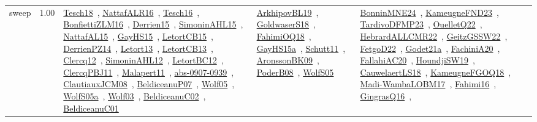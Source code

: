 {\begin{longtable}{p{3cm}r>{\raggedright\arraybackslash}p{6cm}>{\raggedright\arraybackslash}p{6cm}>{\raggedright\arraybackslash}p{8cm}}
\index{sweep}\index{Algorithms!sweep}sweep &  1.00 & \href{../works/Tesch18.pdf}{Tesch18}~\cite{Tesch18}, \href{../works/NattafALR16.pdf}{NattafALR16}~\cite{NattafALR16}, \href{../works/Tesch16.pdf}{Tesch16}~\cite{Tesch16}, \href{../works/BonfiettiZLM16.pdf}{BonfiettiZLM16}~\cite{BonfiettiZLM16}, \href{../works/Derrien15.pdf}{Derrien15}~\cite{Derrien15}, \href{../works/SimoninAHL15.pdf}{SimoninAHL15}~\cite{SimoninAHL15}, \href{../works/NattafAL15.pdf}{NattafAL15}~\cite{NattafAL15}, \href{../works/GayHS15.pdf}{GayHS15}~\cite{GayHS15}, \href{../works/LetortCB15.pdf}{LetortCB15}~\cite{LetortCB15}, \href{../works/DerrienPZ14.pdf}{DerrienPZ14}~\cite{DerrienPZ14}, \href{../works/Letort13.pdf}{Letort13}~\cite{Letort13}, \href{../works/LetortCB13.pdf}{LetortCB13}~\cite{LetortCB13}, \href{../works/Clercq12.pdf}{Clercq12}~\cite{Clercq12}, \href{../works/SimoninAHL12.pdf}{SimoninAHL12}~\cite{SimoninAHL12}, \href{../works/LetortBC12.pdf}{LetortBC12}~\cite{LetortBC12}, \href{../works/ClercqPBJ11.pdf}{ClercqPBJ11}~\cite{ClercqPBJ11}, \href{../works/Malapert11.pdf}{Malapert11}~\cite{Malapert11}, \href{../works/abs-0907-0939.pdf}{abs-0907-0939}~\cite{abs-0907-0939}, \href{../works/ClautiauxJCM08.pdf}{ClautiauxJCM08}~\cite{ClautiauxJCM08}, \href{../works/BeldiceanuP07.pdf}{BeldiceanuP07}~\cite{BeldiceanuP07}, \href{../works/Wolf05.pdf}{Wolf05}~\cite{Wolf05}, \href{../works/WolfS05a.pdf}{WolfS05a}~\cite{WolfS05a}, \href{../works/Wolf03.pdf}{Wolf03}~\cite{Wolf03}, \href{../works/BeldiceanuC02.pdf}{BeldiceanuC02}~\cite{BeldiceanuC02}, \href{../works/BeldiceanuC01.pdf}{BeldiceanuC01}~\cite{BeldiceanuC01} & \href{../works/ArkhipovBL19.pdf}{ArkhipovBL19}~\cite{ArkhipovBL19}, \href{../works/GoldwaserS18.pdf}{GoldwaserS18}~\cite{GoldwaserS18}, \href{../works/FahimiOQ18.pdf}{FahimiOQ18}~\cite{FahimiOQ18}, \href{../works/GayHS15a.pdf}{GayHS15a}~\cite{GayHS15a}, \href{../works/Schutt11.pdf}{Schutt11}~\cite{Schutt11}, \href{../works/AronssonBK09.pdf}{AronssonBK09}~\cite{AronssonBK09}, \href{../works/PoderB08.pdf}{PoderB08}~\cite{PoderB08}, \href{../works/WolfS05.pdf}{WolfS05}~\cite{WolfS05} & \href{../works/BonninMNE24.pdf}{BonninMNE24}~\cite{BonninMNE24}, \href{../works/KameugneFND23.pdf}{KameugneFND23}~\cite{KameugneFND23}, \href{../works/TardivoDFMP23.pdf}{TardivoDFMP23}~\cite{TardivoDFMP23}, \href{../works/OuelletQ22.pdf}{OuelletQ22}~\cite{OuelletQ22}, \href{../works/HebrardALLCMR22.pdf}{HebrardALLCMR22}~\cite{HebrardALLCMR22}, \href{../works/GeitzGSSW22.pdf}{GeitzGSSW22}~\cite{GeitzGSSW22}, \href{../works/FetgoD22.pdf}{FetgoD22}~\cite{FetgoD22}, \href{../works/Godet21a.pdf}{Godet21a}~\cite{Godet21a}, \href{../works/FachiniA20.pdf}{FachiniA20}~\cite{FachiniA20}, \href{../works/FallahiAC20.pdf}{FallahiAC20}~\cite{FallahiAC20}, \href{../works/HoundjiSW19.pdf}{HoundjiSW19}~\cite{HoundjiSW19}, \href{../works/CauwelaertLS18.pdf}{CauwelaertLS18}~\cite{CauwelaertLS18}, \href{../works/KameugneFGOQ18.pdf}{KameugneFGOQ18}~\cite{KameugneFGOQ18}, \href{../works/Madi-WambaLOBM17.pdf}{Madi-WambaLOBM17}~\cite{Madi-WambaLOBM17}, \href{../works/Fahimi16.pdf}{Fahimi16}~\cite{Fahimi16}, \href{../works/GingrasQ16.pdf}{GingrasQ16}~\cite{GingrasQ16}, 
\end{longtable}}
